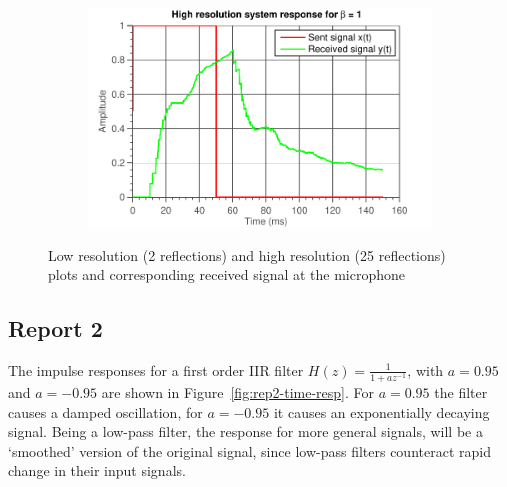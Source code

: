 \documentclass[11pt,titlepage]{report}
\begin{document}
\begin{figure}[H]
\begin{subfigure}{0.49\textwidth}
	\end{subfigure}
	\begin{subfigure}{0.49\textwidth}
		\includegraphics[width=\textwidth]{../../deliverable-7-resources/figures/ass-1/report-1/ass-1-report-1-system-response-25-copies-beta-1.pdf}
	\end{subfigure}
	\caption{Low resolution (2 reflections) and high resolution (25 reflections) plots and corresponding received signal at the microphone}
	\label{fig:rep1-reflections-matlab}
\end{figure}

\subsection{Report 2}
The impulse responses for a first order IIR filter $H(z) = \frac{1}{1+az^{-1}}$, with $a=0.95$ and $a=-0.95$ are shown in Figure~\ref{fig:rep2-time-resp}. For $a=0.95$ the filter causes a damped oscillation, for $a=-0.95$ it causes an exponentially decaying signal. Being a low-pass filter, the response for more general signals, will be a `smoothed' version of the original signal, since low-pass filters counteract rapid change in their input signals. %
\end{document}

